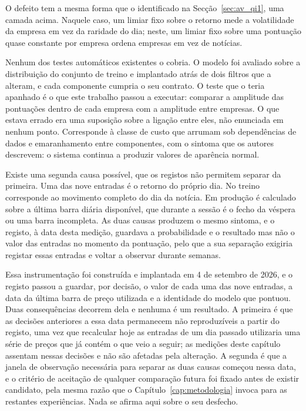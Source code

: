 O defeito tem a mesma forma que o identificado na Secção~\ref{sec:av_qi1}, uma camada acima. Naquele
caso, um limiar fixo sobre o retorno mede a volatilidade da empresa em vez da raridade do dia; neste,
um limiar fixo sobre uma pontuação quase constante por empresa ordena empresas em vez de notícias.

Nenhum dos testes automáticos existentes o cobria. O modelo foi avaliado sobre a distribuição do
conjunto de treino e implantado atrás de dois filtros que a alteram, e cada componente cumpria o seu
contrato. O teste que o teria apanhado é o que este trabalho passou a executar: comparar a amplitude
das pontuações dentro de cada empresa com a amplitude entre empresas. O
que estava errado era uma suposição sobre a ligação entre eles, não enunciada em nenhum ponto.
Corresponde à classe de custo que \textcite{sculley2015debt} arrumam sob dependências de dados e
emaranhamento entre componentes, com o sintoma que os autores descrevem: o sistema continua a
produzir valores de aparência normal.

Existe uma segunda causa possível, que os registos não permitem separar da primeira. Uma das nove entradas é o retorno do próprio dia. No treino corresponde ao movimento completo do
dia da notícia. Em produção é calculado sobre a última barra diária disponível, que durante a
sessão é o fecho da véspera ou uma barra incompleta. As duas causas produzem o mesmo sintoma, e
o registo, à data desta medição, guardava a probabilidade e o resultado mas não o valor das
entradas no momento da pontuação, pelo que a sua separação exigiria registar essas entradas e
voltar a observar durante semanas.

Essa instrumentação foi construída e implantada em 4 de setembro de 2026, e o registo passou a
guardar, por decisão, o valor de cada uma das nove entradas, a data da última barra de preço
utilizada e a identidade do modelo que pontuou. Duas consequências decorrem dela e nenhuma é um
resultado. A primeira é que as decisões anteriores a essa data permanecem não reproduzíveis a
partir do registo, uma vez que recalcular hoje as entradas de um dia passado utilizaria uma série
de preços que já contém o que veio a seguir; as medições deste capítulo assentam nessas decisões
e não são afetadas pela alteração. A segunda é que a janela de observação necessária para separar
as duas causas começou nessa data, e o critério de aceitação de qualquer comparação futura foi
fixado antes de existir candidato, pela mesma razão que o Capítulo~\ref{cap:metodologia}
invoca para as restantes experiências. Nada se afirma aqui sobre o seu desfecho.

